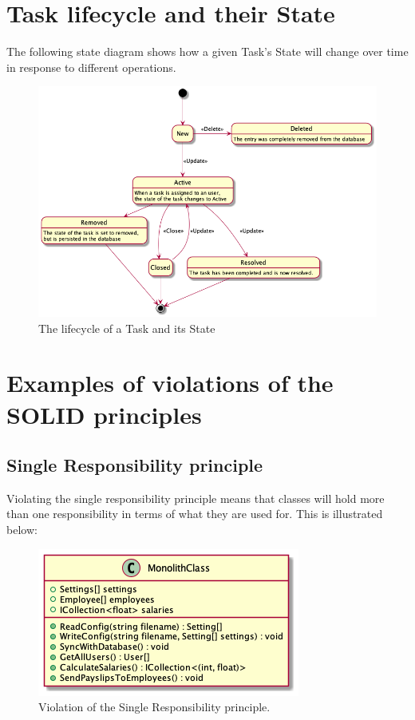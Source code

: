 \documentclass[12pt,letterpaper]{article}
\begin{document}
\section*{Task lifecycle and their State}

The following state diagram shows how a given Task's State will change over time in response to different operations.

\begin{figure}[h]
    \center
    \includegraphics[scale=0.5]{../out/Documents/plantuml/exercise3/exercise3.png}
    \caption{The lifecycle of a Task and its State}
    \label{uml.exercise3}
\end{figure}

\pagebreak
\section*{Examples of violations of the SOLID principles}

\subsection*{Single Responsibility principle}

Violating the single responsibility principle means that classes will hold more than one responsibility in terms of what they are used for. This is illustrated below:

\begin{figure}[h]
    \centering
    \includegraphics[scale=0.65]{../out/Documents/plantuml/exercise4_single_responsibility/exercise4_single_responsibility.png}
    \caption{Violation of the Single Responsibility principle.}
\end{figure}
\end{document}
